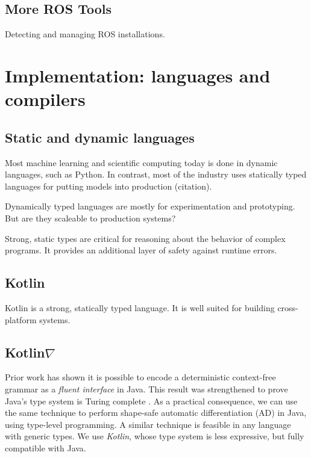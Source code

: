 \documentclass[12pt,initial,twoside,maitrise]{dms}
\numberwithin{equation}{section}
\numberwithin{table}{chapter}
\numberwithin{figure}{chapter}
\begin{document}
\section{More ROS Tools}

Detecting and managing ROS installations.

\chapter{Implementation: languages and compilers}

\section{Static and dynamic languages}

Most machine learning and scientific computing today is done in dynamic languages, such as Python. In contrast, most of the industry uses statically typed languages for putting models into production (citation).

Dynamically typed languages are mostly for experimentation and prototyping. But are they scaleable to production systems?

Strong, static types are critical for reasoning about the behavior of complex programs. It provides an additional layer of safety against runtime errors.

\section{Kotlin}

Kotlin is a strong, statically typed language. It is well suited for building cross-platform systems.

\section{Kotlin$\nabla$}

Prior work has shown it is possible to encode a deterministic context-free grammar as a \textit{fluent interface} \cite{gil2016formal} in Java. This result was strengthened to prove Java's type system is Turing complete \cite{Grigore:2017:JGT:3009837.3009871}. As a practical consequence, we can use the same technique to perform shape-safe automatic differentiation (AD) in Java, using type-level programming. A similar technique is feasible in any language with generic types. We use \textit{Kotlin}, whose type system is less expressive, but fully compatible with Java.
\end{document}
